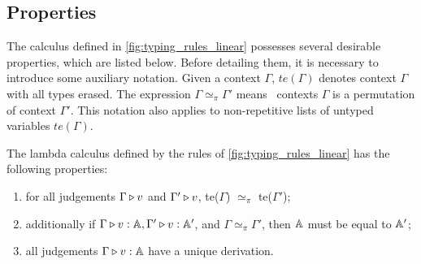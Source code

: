\begin{comment}
11 \hspace{10 pt} &    x: \mathbb{\typeB \oplus \typeB},  y: \mathbb{A \otimes A} \triangleright \, 
\text{case } x \,  
  \left\{
    \begin{aligned} 
    &\inl_{\typeB}(w) \Rightarrow \text{dis}(w) \text{ to} * . \, \textbf{Dis1st} \, y; \\
    &\inr_{\typeB}(z) \Rightarrow  \text{dis}(z) \text{ to} *. \textbf{Dis2nd} \, y   \\ 
  \end{aligned}  
  \right\}  & \text{($8,9,10,\text{case}$)} \\
12 \hspace{10 pt} & x: \mathbb{\typeB \oplus \typeB} \triangleright \lambda y: \mathbb{A \otimes A}. \, 
\text{case } x \,  
  \left\{ \ldots 
  \right\}   & \text{($11,\multimap_i$)} \\
13 \hspace{10 pt} & - \triangleright  \lambda x: \mathbb{\typeB \oplus \typeB}. \, \lambda y: \mathbb{A \otimes A}. \, 
\text{case } x \,  
  \left\{ \ldots  
  \right\}   & \text{($12,\multimap_i$)}
\end{split}
\end{equation*}
\end{example}
\end{comment}






\subsection{Properties}


The calculus defined in \autoref{fig:typing_rules_linear} possesses several desirable properties, which are listed below. Before detailing them, it is necessary to introduce some auxiliary notation. Given a context $\Gamma$, $te(\Gamma)$ denotes context $\Gamma$ with all types erased. The expression $\Gamma \simeq_{\pi} \Gamma'$ means  contexts $\Gamma$ is a permutation of context $\Gamma'$. This notation also applies to non-repetitive lists of untyped variables $te(\Gamma)$.


\begin{theorem} \label {theorem:unique_der}
   The lambda calculus defined by the rules of \autoref{fig:typing_rules_linear} has the following properties:
   \begin{enumerate}
     \item\label{perm} for all judgements $\Gamma \triangleright v$ and $\Gamma'
             \triangleright v$, te($\Gamma$) $\simeq_{\pi}$  te($\Gamma'$); 
     \item\label{type} additionally if $\Gamma \triangleright v: \mathbb{A},
       \Gamma' \triangleright v: \mathbb{A}'$, and $\Gamma \simeq_{\pi}
       \Gamma'$, then $\mathbb{A}$ must be equal to $\mathbb{A}'$;
     \item\label{der} all judgements $\Gamma \triangleright v:\mathbb{A}$ have a unique derivation.
\end{enumerate}
\end{theorem}

